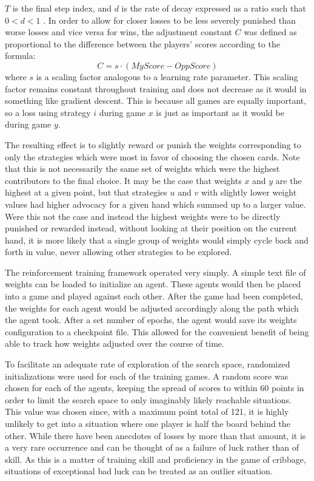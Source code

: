 $T$ is the final step index,
and $d$ is the rate of decay expressed as a ratio such that $0 < d < 1$
\cite{tdgammon}.
%
In order to allow for closer losses to be less severely punished than worse
losses and vice versa for wins,
the adjustment constant $C$ was defined as proportional to the difference
between the players' scores according to the formula:
\[
	C = s \cdot \left({MyScore} - {OppScore}\right) 
\]
where $s$ is a scaling factor analogous to a learning rate parameter.
%
This scaling factor remains constant throughout training
and does not decrease as it would in something like gradient descent.
%
This is because all games are equally important,
so a loss using strategy $i$ during game $x$ is just as important as
it would be during game $y$.

The resulting effect is to slightly reward or punish the weights
corresponding to only the strategies which were most in favor of choosing
the chosen cards.
%
Note that this is not necessarily the same set of weights which were the highest
contributors to the final choice.
%
It may be the case that weights $x$ and $y$ are the highest at a given point,
but that strategies $u$ and $v$ with slightly lower weight values had higher
advocacy for a given hand which summed up to a larger value.
%
Were this not the case and instead the highest weights were to be directly
punished or rewarded instead,
without looking at their position on the current hand,
it is more likely that a single group of weights would simply cycle
back and forth in value,
never allowing other strategies to be explored.

The reinforcement training framework operated very simply.
%
A simple text file of weights can be loaded to initialize an agent.
%
These agents would then be placed into a game and played against each other.
%
After the game had been completed, the weights for each agent would be adjusted
accordingly along the path which the agent took.
%
After a set number of epochs, the agent would save its weights configuration to a
checkpoint file.
%
This allowed for the convenient benefit of being able to track how weights
adjusted over the course of time.

To facilitate an adequate rate of exploration of the search space,
randomized initializations were used for each of the training games.
%
A random score was chosen for each of the agents,
keeping the spread of scores to within 60 points
in order to limit the search space to only imaginably likely reachable
situations.
%
This value was chosen since,
with a maximum point total of 121,
it is highly unlikely to get into a situation where one player is half the board
behind the other.
%
While there have been anecdotes of losses by more than that amount,
it is a very rare occurrence and can be thought of as a failure of luck
rather than of skill.
%
As this is a matter of training skill and proficiency in the game of cribbage,
situations of exceptional bad luck can be treated as an outlier situation.

